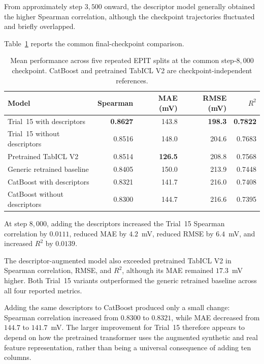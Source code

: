 \documentclass{article}
\begin{document}
From approximately step \(3{,}500\) onward, the descriptor model generally
obtained the higher Spearman correlation, although the checkpoint trajectories
fluctuated and briefly overlapped.

Table~\ref{tab:magpie-trial15-step8000} reports the common final-checkpoint
comparison.

\begin{table}[htbp]
\centering
\caption{Mean performance across five repeated EPIT splits at the common
step-\(8{,}000\) checkpoint. CatBoost and pretrained TabICL V2 are
checkpoint-independent references.}
\label{tab:magpie-trial15-step8000}
\begin{tabular}{lrrrr}
\hline
Model & Spearman & MAE (mV) & RMSE (mV) & \(R^2\) \\
\hline
Trial~15 with descriptors
    & \textbf{0.8627} & 143.8 & \textbf{198.3} & \textbf{0.7822} \\
Trial~15 without descriptors
    & 0.8516 & 148.0 & 204.6 & 0.7683 \\
Pretrained TabICL V2
    & 0.8514 & \textbf{126.5} & 208.8 & 0.7568 \\
Generic retrained baseline
    & 0.8405 & 150.0 & 213.9 & 0.7448 \\
CatBoost with descriptors
    & 0.8321 & 141.7 & 216.0 & 0.7408 \\
CatBoost without descriptors
    & 0.8300 & 144.7 & 216.6 & 0.7395 \\
\hline
\end{tabular}
\end{table}

At step \(8{,}000\), adding the descriptors increased the Trial~15 Spearman
correlation by \(0.0111\), reduced MAE by \(4.2\)~mV, reduced RMSE by
\(6.4\)~mV, and increased \(R^2\) by \(0.0139\).

The descriptor-augmented model also exceeded pretrained TabICL V2 in Spearman
correlation, RMSE, and \(R^2\), although its MAE remained \(17.3\)~mV higher.
Both Trial~15 variants outperformed the generic retrained baseline across all
four reported metrics.

Adding the same descriptors to CatBoost produced only a small change: Spearman
correlation increased from \(0.8300\) to \(0.8321\), while MAE decreased from
\(144.7\) to \(141.7\)~mV. The larger improvement for Trial~15 therefore
appears to depend on how the pretrained transformer uses the augmented
synthetic and real feature representation, rather than being a universal
consequence of adding ten columns.
\end{document}
